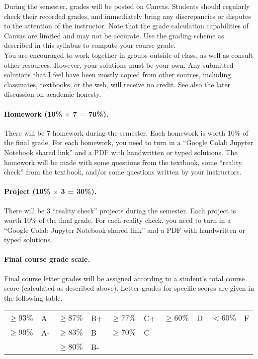 \documentclass[letterpaper,10pt]{article}
\begin{document}
During the semester, grades will be posted on Canvas.
Students should regularly check their recorded grades, and immediately bring
any discrepancies or disputes to the attention of the instructor.  Note that
the grade calculation capabilities of Canvas are limited and may not be
accurate. Use the grading scheme as described in this syllabus to compute your
course grade.\\

You are encouraged to work together in groups outside of class, as well as
consult other resources.  However, your solutions must be your own.  Any
submitted solutions that I feel have been mostly copied from other sources,
including classmates, textbooks, or the web, will receive no credit.  See also
the later discussion on academic honesty.\\

\paragraph{Homework (10\% $\times$ 7 = 70\%).}
There will be 7 homework during the semester. Each homework is worth 10\% of
the final grade.  For each homework, you need to turn in 
a ``Google Colab Jupyter Notebook shared link''
and a PDF with handwritten or typed solutions.
The homework will be made with some questions from the textbook, some ``reality check'' from the textbook, and/or some questions written by your instructors.
\\

\paragraph{Project (10\% $\times$ 3 = 30\%).}
There will be 3 ``reality check'' projects during the semester. Each project is worth 10\% of
the final grade.
For each reality check, you need to turn in 
a ``Google Colab Jupyter Notebook shared link''
and a PDF with handwritten or typed solutions.\\

\paragraph{Final course grade scale.}
Final course letter grades will be assigned according to a student's total course score (calculated as described above).
Letter grades for specific scores are given in the following table.
\smallskip

\renewcommand{\arraystretch}{1.15}
\hspace*{3em}\begin{tabular}{rl@{\quad}|@{\quad}rl@{\quad}|@{\quad}rl|@{\quad}rl|@{\quad}rl}
$\ge 93\%$ & A  & $\ge 87\%$ & B+ & $\ge 77\%$ & C+ & $\ge 60\%$ & D\phantom{+} & $< 60\%$ & F\\
$\ge 90\%$ & A- & $\ge 83\%$ & B  & $\ge 70\%$ & C  \\
           &    & $\ge 80\%$ & B- & 
\end{tabular}
\end{document}
